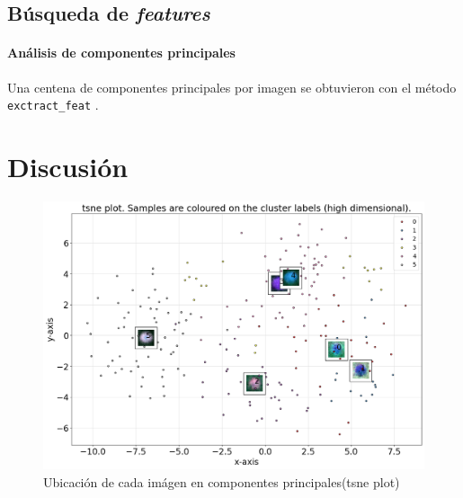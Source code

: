 \documentclass{article}
\begin{document}
\subsection{Búsqueda de \emph{features}}



\paragraph{Análisis de componentes principales}
Una centena de componentes principales por imagen se obtuvieron con el método \verb'exctract_feat' \cite{taskesen_pca_2020}.




\section{Discusión}

\begin{figure}
  \centering
  \includegraphics[width= 0.8\linewidth]{tsne}
  \caption{Ubicación de cada imágen en componentes principales(tsne plot)}
\end{figure}


\printbibliography[title= Referencias, heading=bibintoc]
\end{document}
